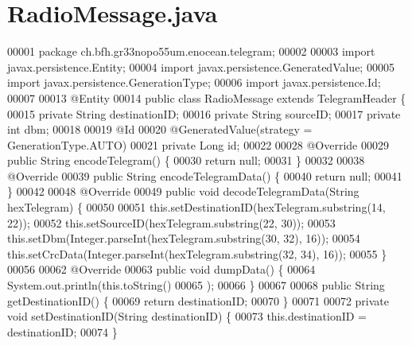 \section{Radio\+Message.\+java}
\label{RadioMessage_8java_source}

\begin{DoxyCode}
00001 \textcolor{keyword}{package }ch.bfh.gr33nopo55um.enocean.telegram;
00002 
00003 \textcolor{keyword}{import} javax.persistence.Entity;
00004 \textcolor{keyword}{import} javax.persistence.GeneratedValue;
00005 \textcolor{keyword}{import} javax.persistence.GenerationType;
00006 \textcolor{keyword}{import} javax.persistence.Id;
00007 
00013 @Entity
00014 \textcolor{keyword}{public} \textcolor{keyword}{class }RadioMessage \textcolor{keyword}{extends} TelegramHeader \{
00015     \textcolor{keyword}{private} String destinationID;
00016     \textcolor{keyword}{private} String sourceID;
00017     \textcolor{keyword}{private} \textcolor{keywordtype}{int} dbm;
00018 
00019     @Id
00020     @GeneratedValue(strategy = GenerationType.AUTO)
00021     private Long \textcolor{keywordtype}{id};
00022 
00028     @Override
00029     public String encodeTelegram() \{
00030         \textcolor{keywordflow}{return} null;
00031     \}
00032 
00038     @Override
00039     \textcolor{keyword}{public} String encodeTelegramData() \{
00040         \textcolor{keywordflow}{return} null;
00041     \}
00042 
00048     @Override
00049     \textcolor{keyword}{public} \textcolor{keywordtype}{void} decodeTelegramData(String hexTelegram) \{
00050 
00051         this.setDestinationID(hexTelegram.substring(14, 22));
00052         this.setSourceID(hexTelegram.substring(22, 30));
00053         this.setDbm(Integer.parseInt(hexTelegram.substring(30, 32), 16));
00054         this.setCrcData(Integer.parseInt(hexTelegram.substring(32, 34), 16));
00055     \}
00056 
00062     @Override
00063     \textcolor{keyword}{public} \textcolor{keywordtype}{void} dumpData() \{
00064         System.out.println(this.toString()
00065         );
00066     \}
00067 
00068     \textcolor{keyword}{public} String getDestinationID() \{
00069         \textcolor{keywordflow}{return} destinationID;
00070     \}
00071 
00072     \textcolor{keyword}{private} \textcolor{keywordtype}{void} setDestinationID(String destinationID) \{
00073         this.destinationID = destinationID;
00074     \}

\end{DoxyCode}
